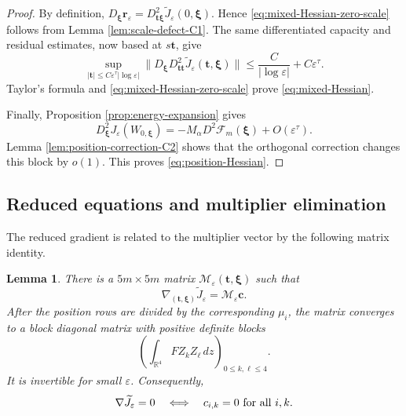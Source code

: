 \documentclass[11pt]{article}
\newtheorem{lemma}[theorem]{Lemma}
\numberwithin{equation}{section}
\begin{document}
\begin{proof}
By definition,
$D_{\boldsymbol\xi}\boldsymbol r_\varepsilon
=D_{\boldsymbol t\boldsymbol\xi}^2
\widetilde J_\varepsilon(0,\boldsymbol\xi)$. Hence
\eqref{eq:mixed-Hessian-zero-scale} follows from Lemma
\ref{lem:scale-defect-C1}. The same differentiated capacity and
residual estimates, now based at $s\boldsymbol t$, give
\[
\sup_{|\boldsymbol t|\leq
C\varepsilon^\tau|\log\varepsilon|}
\|D_{\boldsymbol\xi}D_{\boldsymbol t\boldsymbol t}^2
\widetilde J_\varepsilon(\boldsymbol t,\boldsymbol\xi)\|
\leq \frac{C}{|\log\varepsilon|}+C\varepsilon^\tau.
\]
Taylor's formula and \eqref{eq:mixed-Hessian-zero-scale} prove
\eqref{eq:mixed-Hessian}.

Finally, Proposition \ref{prop:energy-expansion} gives
\[
D_{\boldsymbol\xi}^2J_\varepsilon(W_{0,\boldsymbol\xi})
=-M_\alpha D^2\mathcal F_m(\boldsymbol\xi)
+O(\varepsilon^\tau).
\]
Lemma \ref{lem:position-correction-C2} shows that the orthogonal
correction changes this block by $o(1)$. This proves
\eqref{eq:position-Hessian}.
\end{proof}

\subsection{Reduced equations and multiplier elimination}

The reduced gradient is related to the multiplier vector by the following matrix identity.

\begin{lemma}\label{lem:multipliers-gradient}
There is a $5m\times5m$ matrix
$\mathcal M_\varepsilon(\boldsymbol t,\boldsymbol\xi)$ such that
\begin{equation}\label{eq:gradient-multiplier}
\nabla_{(\boldsymbol t,\boldsymbol\xi)}
\widetilde J_\varepsilon
=\mathcal M_\varepsilon\boldsymbol c.
\end{equation}
After the position rows are divided by the corresponding $\mu_i$, the matrix converges to a block diagonal matrix with positive definite blocks
\[
\left(\int_{\mathbb R^4}FZ_kZ_\ell\,dz\right)_{0\leq k,\ell\leq4}.
\]
It is invertible for small $\varepsilon$. Consequently,
\begin{equation}\label{eq:gradient-multiplier-equivalence}
\nabla\widetilde J_\varepsilon=0
\quad\Longleftrightarrow\quad
c_{i,k}=0\ \hbox{for all }i,k.
\end{equation}
\end{lemma}
\end{document}
